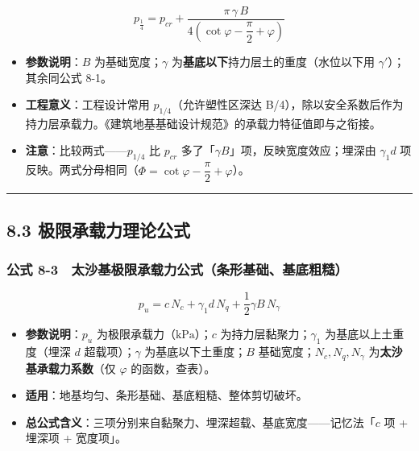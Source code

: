 \documentclass[
]{article}
\providecommand{\tightlist}{%
  \setlength{\itemsep}{0pt}\setlength{\parskip}{0pt}}
\begin{document}
\[p_{\frac{1}{4}}=p_{cr}+\frac{\pi\,\gamma\,B}{4\left(\cot\varphi-\dfrac{\pi}{2}+\varphi\right)}\]

\begin{itemize}
\tightlist
\item
  \textbf{参数说明}：\(B\) 为基础宽度；\(\gamma\)
  为\textbf{基底以下}持力层土的重度（水位以下用
  \(\gamma'\)）；其余同公式 8-1。
\item
  \textbf{工程意义}：工程设计常用 \(p_{1/4}\)（允许塑性区深达
  B/4），除以安全系数后作为持力层承载力。《建筑地基基础设计规范》的承载力特征值即与之衔接。
\item
  \textbf{注意}：比较两式------\(p_{1/4}\) 比 \(p_{cr}\)
  多了「\(\gamma B\)」项，反映宽度效应；埋深由 \(\gamma_1 d\)
  项反映。两式分母相同（\(\Phi=\cot\varphi-\dfrac{\pi}{2}+\varphi\)）。
\end{itemize}

\begin{center}\rule{0.5\linewidth}{0.5pt}\end{center}

\subsection{8.3
极限承载力理论公式}\label{ux6781ux9650ux627fux8f7dux529bux7406ux8bbaux516cux5f0f}

\subsubsection{公式
8-3　太沙基极限承载力公式（条形基础、基底粗糙）}\label{ux516cux5f0f-8-3-ux592aux6c99ux57faux6781ux9650ux627fux8f7dux529bux516cux5f0fux6761ux5f62ux57faux7840ux57faux5e95ux7c97ux7cd9}

\[\boxed{p_u=c\,N_c+\gamma_1 d\,N_q+\frac{1}{2}\gamma B\,N_\gamma}\]

\begin{itemize}
\tightlist
\item
  \textbf{参数说明}：\(p_u\) 为极限承载力（\(\mathrm{kPa}\)）；\(c\)
  为持力层黏聚力；\(\gamma_1\) 为基底以上土重度（埋深 \(d\)
  超载项）；\(\gamma\) 为基底以下土重度；\(B\)
  基础宽度；\(N_c,N_q,N_\gamma\) 为\textbf{太沙基承载力系数}（仅
  \(\varphi\) 的函数，查表）。
\item
  \textbf{适用}：地基均匀、条形基础、基底粗糙、整体剪切破坏。
\item
  \textbf{总公式含义}：三项分别来自黏聚力、埋深超载、基底宽度------记忆法「\(c\)
  项 + 埋深项 + 宽度项」。
\end{itemize}
\end{document}
